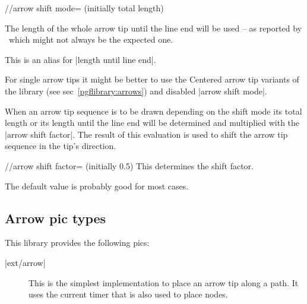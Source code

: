\begin{multicols}{2}
\begin{key}{/\tikzext/arrow shift mode= (initially total length)}
\begin{description}
  The length of the whole arrow tip until the line end will be used --
  as reported by \pgfname\ which might not always be the expected one.
\item[|arrow shift mode|=\declare{|line end|}]

  This is an alias for |length until line end|.
\end{description}
\begin{codeexample}[preamble=\usetikzlibrary{ext.arrows-plus}]
\end{codeexample}

For single arrow tips it might be better to use the Centered arrow tip variants
of the  library (see sec~\ref{pgflibrary:arrows})
and disabled |arrow shift mode|.
\end{key}

When an arrow tip sequence is to be drawn depending on the shift mode
its total length or its length until the line end will be determined
and multiplied with the |arrow shift factor|.
The result of this evaluation is used to shift the arrow tip sequence
in the tip's direction.

\begin{key}{/\tikzext/arrow shift factor= (initially 0.5)}
  This determines the shift factor.
  
  The default value is probably good for most cases.
\end{key}

\subsection{Arrow pic types}

This library provides the following pics:
\begin{description}
\item[|ext/arrow|]
  This is the simplest implementation to place an arrow tip along a path.
  It uses the current timer that is also used to place nodes.
  

\end{description}
\end{multicols}
